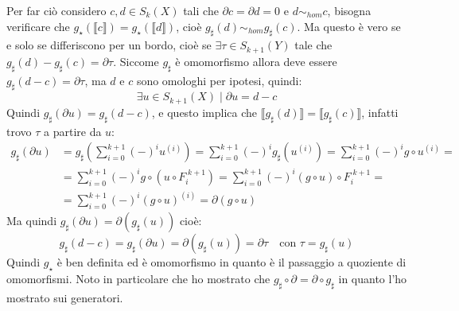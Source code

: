 Per far ciò considero $ c,d \in S_k(X) $ tali che
$ \partial c = \partial d = 0 $ e $ d \sim_{hom} c $, bisogna verificare che
$ g_\star( \llbracket c \rrbracket ) = g_\star( \llbracket d \rrbracket) $, cioè
$ g_\sharp (d) \sim_{hom} g_\sharp (c) $. Ma questo è vero se e solo se differiscono per un
bordo, cioè se $ \exists \tau \in S_{k+1}(Y) $ tale che
$ g_\sharp(d) - g_\sharp (c) = \partial \tau $. Siccome $ g_\sharp $ è omomorfismo allora deve essere
$ g_\sharp (d - c) = \partial \tau $, ma $ d $ e $ c $ sono omologhi per ipotesi, quindi:
\[
  \exists u \in S_{k+1}(X) \; | \; \partial u = d - c
\]
Quindi $ g_\sharp(\partial u) = g_\sharp (d - c) $, e questo implica che $ \llbracket g_\sharp (d) \rrbracket = \llbracket g_\sharp(c) \rrbracket $, infatti
trovo $ \tau $ a partire da $ u $:
\begin{align*}
  g_\sharp (\partial u) & = g_\sharp \left(\sum_{i = 0}^{k+1} (-)^i u^{(i)}\right) = \sum_{i=0}^{k+1}(-)^i g_\sharp (u^{(i)}) =
                          \sum_{i=0}^{k+1}(-)^i g \circ u^{(i)} = \\
                        & = \sum_{i = 0}^{k+1} (-)^i g \circ \left( u \circ F_i^{\; k+1} \right) =
                          \sum_{i = 0}^{k+1} (-)^i  \left( g \circ u \right) \circ F_i^{\; k+1} = \\
                        & = \sum_{i = 0}^{k+1}(-)^i \left( g \circ u \right)^{(i)} = \partial \left( g \circ u \right)
\end{align*}
Ma quindi $ g_\sharp(\partial u) = \partial (g_\sharp (u)) $ cioè:
\[
  g_\sharp(d-c) = g_\sharp (\partial u) = \partial (g_\sharp (u)) = \partial \tau \quad \text{con } \tau = g_\sharp(u)
\]
Quindi $ g_\star $ è ben definita ed è omomorfismo in quanto
è il passaggio a quoziente di omomorfismi.
Noto in particolare che ho mostrato che $ g_\sharp \circ \partial = \partial \circ g_\sharp $
in quanto l'ho mostrato sui generatori.

